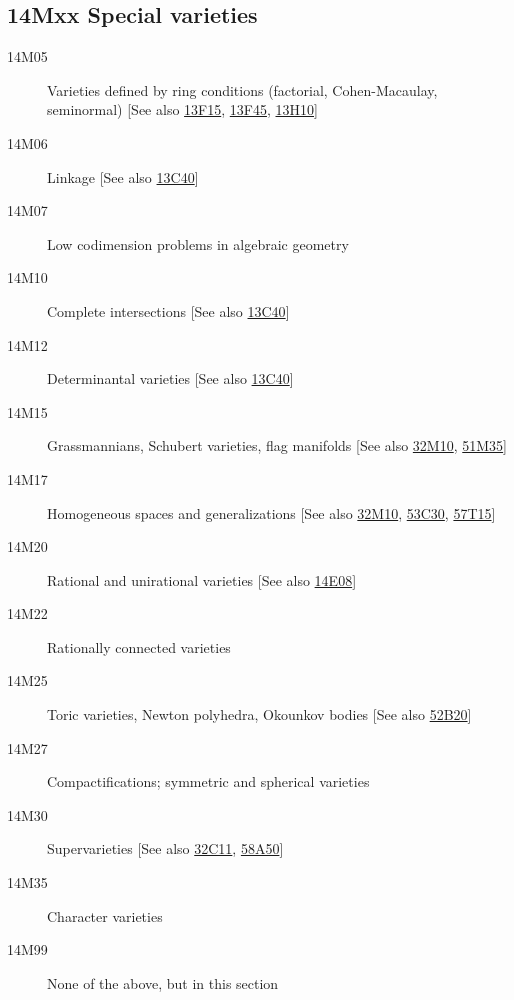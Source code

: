 \subsection*{14Mxx Special varieties }\label{14Mxx}
\begin{description}               
\item [14M05]\label{14M05} Varieties defined by ring conditions (factorial, Cohen-Macaulay, seminormal) [See also \hyperref[13F15]{13F15}, \hyperref[13F45]{13F45}, \hyperref[13H10]{13H10}]
\item [14M06]\label{14M06} Linkage [See also \hyperref[13C40]{13C40}]
\item [14M07]\label{14M07} Low codimension problems in algebraic geometry
\item [14M10]\label{14M10} Complete intersections [See also \hyperref[13C40]{13C40}]
\item [14M12]\label{14M12} Determinantal varieties [See also \hyperref[13C40]{13C40}]
\item [14M15]\label{14M15} Grassmannians, Schubert varieties, flag manifolds [See also \hyperref[32M10]{32M10}, \hyperref[51M35]{51M35}]
\item [14M17]\label{14M17} Homogeneous spaces and generalizations [See also \hyperref[32M10]{32M10}, \hyperref[53C30]{53C30}, \hyperref[57T15]{57T15}]
\item [14M20]\label{14M20} Rational and unirational varieties [See also \hyperref[14E08]{14E08}]
\item [14M22]\label{14M22} Rationally connected varieties
\item [14M25]\label{14M25} Toric varieties, Newton polyhedra, Okounkov bodies [See also \hyperref[52B20]{52B20}]
\item [14M27]\label{14M27} Compactifications; symmetric and spherical varieties
\item [14M30]\label{14M30} Supervarieties [See also \hyperref[32C11]{32C11}, \hyperref[58A50]{58A50}]
\item [14M35]\label{14M35} Character varieties
\item [14M99]\label{14M99} None of the above, but in this section
\end{description}          
